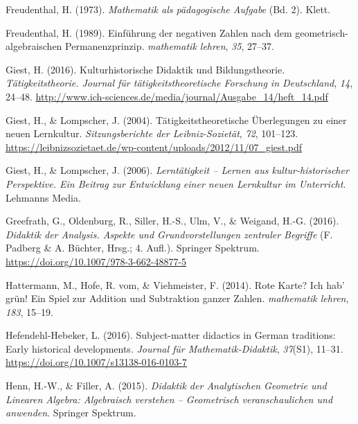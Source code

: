 \documentclass[
]{scrbook}
\newlength{\cslhangindent}
\newlength{\cslentryspacingunit} %
\newenvironment{CSLReferences}[2] %
 {%
  \setlength{\parindent}{0pt}
  \ifodd #1
  \let\oldpar\par
  \def\par{\hangindent=\cslhangindent\oldpar}
  \fi
  \setlength{\parskip}{#2\cslentryspacingunit}
 }%
 {}
\theoremstyle{definition}
\theoremstyle{definition}
\theoremstyle{definition}
\theoremstyle{definition}
\theoremstyle{remark}
\begin{document}
\begin{CSLReferences}{1}{0}
\leavevmode{}%
Freudenthal, H. (1973). \emph{Mathematik als pädagogische {Aufgabe}} (Bd. 2). Klett.

\leavevmode{}%
Freudenthal, H. (1989). Einführung der negativen {Zahlen} nach dem geometrisch-algebraischen {Permanenzprinzip}. \emph{mathematik lehren}, \emph{35}, 27--37.

\leavevmode{}%
Giest, H. (2016). Kulturhistorische {Didaktik} und {Bildungstheorie}. \emph{Tätigkeitstheorie. Journal für tätigkeitstheoretische Forschung in Deutschland}, \emph{14}, 24--48. \url{http://www.ich-sciences.de/media/journal/Ausgabe_14/heft_14.pdf}

\leavevmode{}%
Giest, H., \& Lompscher, J. (2004). Tätigkeitstheoretische Überlegungen zu einer neuen {Lernkultur}. \emph{Sitzungsberichte der Leibniz-Sozietät}, \emph{72}, 101--123. \url{https://leibnizsozietaet.de/wp-content/uploads/2012/11/07_giest.pdf}

\leavevmode{}%
Giest, H., \& Lompscher, J. (2006). \emph{Lerntätigkeit -- {Lernen} aus kultur-historischer {Perspektive}. {Ein} {Beitrag} zur {Entwicklung} einer neuen {Lernkultur} im {Unterricht}}. Lehmanns Media.

\leavevmode{}%
Greefrath, G., Oldenburg, R., Siller, H.-S., Ulm, V., \& Weigand, H.-G. (2016). \emph{Didaktik der {Analysis}. {Aspekte} und {Grundvorstellungen} zentraler {Begriffe}} (F. Padberg \& A. Büchter, Hrsg.; 4. Aufl.). Springer Spektrum. \url{https://doi.org/10.1007/978-3-662-48877-5}

\leavevmode{}%
Hattermann, M., Hofe, R. vom, \& Viehmeister, F. (2014). Rote {Karte}? {Ich} hab' grün! {Ein} {Spiel} zur {Addition} und {Subtraktion} ganzer {Zahlen}. \emph{mathematik lehren}, \emph{183}, 15--19.

\leavevmode{}%
Hefendehl-Hebeker, L. (2016). Subject-matter didactics in {German} traditions: {Early} historical developments. \emph{Journal für Mathematik-Didaktik}, \emph{37}(S1), 11--31. \url{https://doi.org/10.1007/s13138-016-0103-7}

\leavevmode{}%
Henn, H.-W., \& Filler, A. (2015). \emph{Didaktik der {Analytischen} {Geometrie} und {Linearen} {Algebra}: {Algebraisch} verstehen -- {Geometrisch} veranschaulichen und anwenden}. Springer Spektrum.


\end{CSLReferences}
\end{document}
